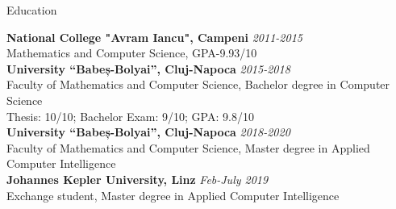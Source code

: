 \documentclass{resume} %
\begin{document}

\begin{rSection}{Education}

{\bf National College "Avram Iancu", Campeni} \hfill {\em 2011-2015} 
\\ Mathematics and Computer Science, GPA-9.93/10
\\{\bf University “Babeș-Bolyai”, Cluj-Napoca} \hfill {\em 2015-2018} 
\\Faculty of Mathematics and Computer Science, Bachelor degree in Computer Science\\ \hfill { Thesis: 10/10; Bachelor Exam: 9/10; GPA: 9.8/10}
\\{\bf University “Babeș-Bolyai”, Cluj-Napoca} \hfill {\em 2018-2020} 
\\Faculty of Mathematics and Computer Science, Master degree in Applied Computer Intelligence
\\{\bf Johannes Kepler University, Linz} \hfill {\em Feb-July 2019} 
\\Exchange student, Master degree in Applied Computer Intelligence


\end{rSection}
\end{document}
